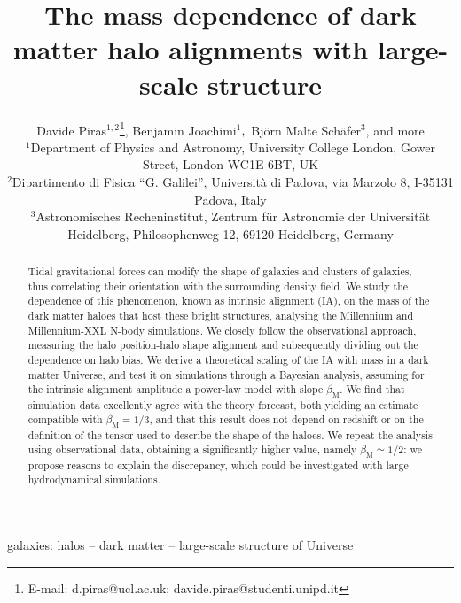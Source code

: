 \documentclass[a4paper,fleqn,usenatbib]{mnras}
\title[The mass dependence of dark matter halo alignments with large-scale structure]{The mass dependence of dark matter halo alignments with large-scale structure}
\author[Piras et al.]{
Davide Piras$^{1, 2}$\thanks{E-mail: d.piras@ucl.ac.uk; davide.piras@studenti.unipd.it},
Benjamin Joachimi$^{1},$
Bj\"{o}rn Malte Sch\"{a}fer$^{3}$, and more
\\
$^{1}$Department of Physics and Astronomy, University College London, Gower Street, London WC1E 6BT, UK\\
$^{2}$Dipartimento di Fisica ``G. Galilei'', Universit\`{a} di Padova, via Marzolo 8, I-35131 Padova, Italy\\
$^{3}$Astronomisches Recheninstitut, Zentrum f\"{u}r Astronomie der Universit\"{a}t Heidelberg, Philosophenweg 12, 69120 Heidelberg, Germany
}
\begin{document}
\label{firstpage}
\pagerange{\pageref{firstpage}--\pageref{lastpage}}
\maketitle

\begin{abstract}
Tidal gravitational forces can modify the shape of galaxies and clusters of galaxies, thus correlating their orientation with the surrounding density field. We study the dependence of this phenomenon, known as intrinsic alignment (IA), on the mass of the dark matter haloes that host these bright structures, analysing the Millennium and Millennium-XXL N-body simulations. We closely follow the observational approach, measuring the halo position-halo shape alignment and subsequently dividing out the dependence on halo bias.
We derive a theoretical scaling of the IA with mass in a dark matter Universe, and test it on simulations through a Bayesian analysis, assuming for the intrinsic alignment amplitude a power-law model with slope $\beta_{\mathrm{M}}$. We find that simulation data excellently agree with the theory forecast, both yielding an estimate compatible with $\beta_{\mathrm{M}} = 1/3$, and that this result does not depend on redshift or on the definition of the tensor used to describe the shape of the haloes. We repeat the analysis using observational data, obtaining a significantly higher value, namely $\beta_{\mathrm{M}} \simeq 1/2$: we propose reasons to explain the discrepancy, which could be investigated with large hydrodynamical simulations.
\end{abstract}

\begin{keywords}
galaxies: halos -- dark matter -- large-scale structure of Universe 
\end{keywords}
\end{document}
